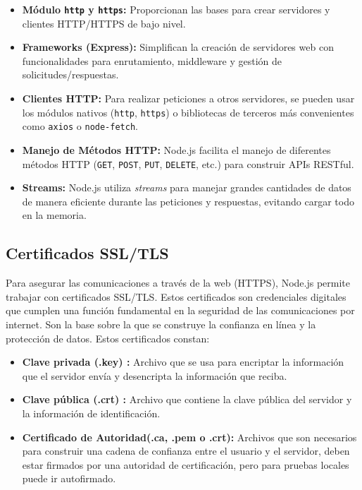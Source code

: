 \documentclass[a4paper, 12pt]{book}
\begin{document}
\begin{itemize}
  \item \textbf{Módulo \texttt{http} y \texttt{https}:} Proporcionan las bases para crear servidores y clientes HTTP/HTTPS de bajo nivel.

  \item \textbf{Frameworks (Express):} Simplifican la creación de servidores web con funcionalidades para enrutamiento, middleware y gestión de solicitudes/respuestas.

  \item \textbf{Clientes HTTP:} Para realizar peticiones a otros servidores, se pueden usar los módulos nativos (\texttt{http}, \texttt{https}) o bibliotecas de terceros más convenientes como \texttt{axios} o \texttt{node-fetch}.

  \item \textbf{Manejo de Métodos HTTP:} Node.js facilita el manejo de diferentes métodos HTTP (\texttt{GET}, \texttt{POST}, \texttt{PUT}, \texttt{DELETE}, etc.) para construir APIs RESTful.

  \item \textbf{Streams:} Node.js utiliza \textit{streams} para manejar grandes cantidades de datos de manera eficiente durante las peticiones y respuestas, evitando cargar todo en la memoria.
\end{itemize}
\subsection{Certificados SSL/TLS}
Para asegurar las comunicaciones a través de la web (HTTPS), Node.js permite trabajar con certificados SSL/TLS. 
Estos certificados son credenciales digitales que cumplen una función fundamental en la seguridad de las comunicaciones por internet. Son la base sobre la que se construye la confianza en línea y la protección de datos. 
Estos certificados constan:

\begin{itemize}
 \item \textbf{Clave privada (.key) :} Archivo que se usa para encriptar la información que el servidor envía y desencripta la información que reciba.
 \item \textbf{Clave pública (.crt) :} Archivo que contiene la clave pública del servidor y la información de identificación.
 \item \textbf{Certificado de Autoridad(.ca, .pem o .crt):} Archivos que son necesarios para construir una cadena de confianza entre el usuario y el servidor, deben estar firmados por una autoridad de certificación, pero para pruebas locales puede ir autofirmado.
\end{itemize}
\end{document}
